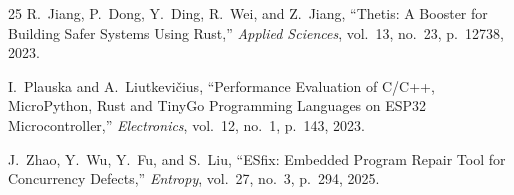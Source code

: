 \documentclass[12pt,a4paper]{article}
\begin{document}
\begin{thebibliography}{25}
R.~Jiang, P.~Dong, Y.~Ding, R.~Wei, and Z.~Jiang, ``Thetis: A Booster for Building Safer Systems Using Rust,'' \textit{Applied Sciences}, vol.~13, no.~23, p.~12738, 2023.

I.~Plauska and A.~Liutkevi\v{c}ius, ``Performance Evaluation of C/C++, MicroPython, Rust and TinyGo Programming Languages on ESP32 Microcontroller,'' \textit{Electronics}, vol.~12, no.~1, p.~143, 2023.

J.~Zhao, Y.~Wu, Y.~Fu, and S.~Liu, ``ESfix: Embedded Program Repair Tool for Concurrency Defects,'' \textit{Entropy}, vol.~27, no.~3, p.~294, 2025.

\end{thebibliography}
\end{document}
